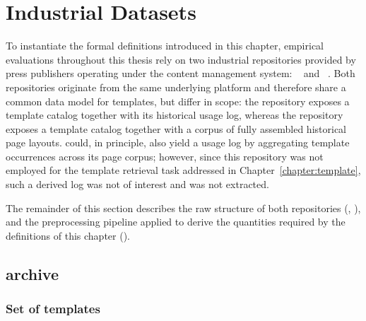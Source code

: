 \section{Industrial Datasets}



To instantiate the formal definitions introduced in this chapter, empirical evaluations throughout this thesis rely on two industrial repositories provided by press publishers operating under the \melody content management system: \publihebdos~\cite{publihebdos} and \laprovence~\cite{laprovence}. Both repositories originate from the same underlying platform and therefore share a common data model for templates, but differ in scope: the \publihebdos repository exposes a template catalog together with its historical usage log, whereas the \laprovence repository exposes a template catalog together with a corpus of fully assembled historical page layouts. \laprovence could, in principle, also yield a usage log by aggregating template occurrences across its page corpus; however, since this repository was not employed for the template retrieval task addressed in Chapter~\ref{chapter:template}, such a derived log was not of interest and was not extracted. 

The remainder of this section describes the raw structure of both repositories (, ), and the preprocessing pipeline applied to derive the quantities required by the definitions of this chapter ().


\subsection{\publihebdos archive}
\label{sec:publihebdos}

\subsubsection{Set of templates}

